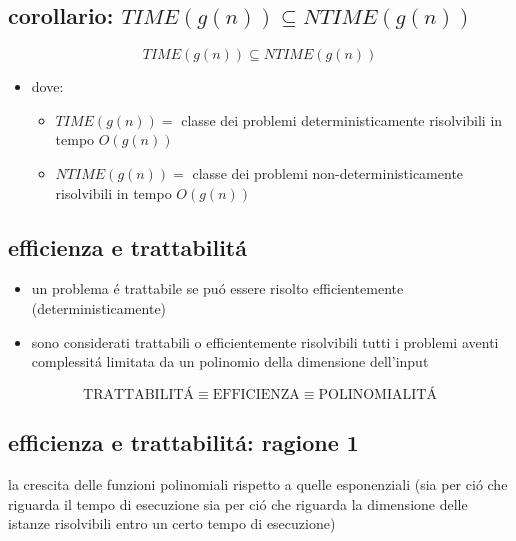 
\subsection*{\color{cyan} corollario: $TIME(g(n))\subseteq NTIME(g(n))$}
\begin{flushleft}
	$$TIME(g(n))\subseteq NTIME(g(n))$$
	\begin{itemize}
		\item dove:
		\begin{itemize}
			\item $TIME(g(n))=$ classe dei problemi deterministicamente risolvibili in tempo $O(g(n))$
			\item $NTIME(g(n))=$ classe dei problemi non-deterministicamente risolvibili in tempo $O(g(n))$
		\end{itemize}
	\end{itemize}
\end{flushleft}


\subsection*{\color{cyan} efficienza e trattabilit\'a}
\begin{flushleft}
	\begin{itemize}
		\item un problema \'e trattabile se pu\'o essere risolto efficientemente (deterministicamente)
		\item sono considerati trattabili o efficientemente risolvibili tutti i problemi aventi complessit\'a limitata da un polinomio della dimensione dell'input
	\end{itemize}
	$$\text{TRATTABILIT\'A}\equiv\text{EFFICIENZA}\equiv\text{POLINOMIALIT\'A}$$
\end{flushleft}


\subsection*{\color{cyan} efficienza e trattabilit\'a: ragione 1}
\begin{flushleft}
	la crescita delle funzioni polinomiali rispetto a quelle esponenziali (sia per ci\'o che riguarda il tempo di esecuzione sia per ci\'o che riguarda la dimensione delle istanze risolvibili entro un certo tempo di esecuzione)
\end{flushleft}

